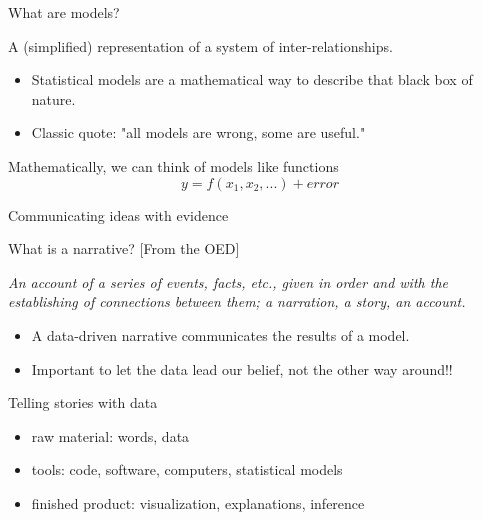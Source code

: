 \documentclass[table]{beamer}\usepackage[]{graphicx}\usepackage[]{color}
\begin{document}
\begin{frame}{What are models?}


\begin{block}{A (simplified) representation of a system of inter-relationships.}

\begin{itemize}
	\item Statistical models are a mathematical way to describe that black box of nature.
	\item Classic quote: "all models are wrong, some are useful."
\end{itemize}

\end{block}

Mathematically, we can think of models like functions
$$ y = f(x_1, x_2, ...) + error $$


\end{frame}



\begin{frame}{Communicating ideas with evidence}

\begin{block}{What is a narrative? [From the OED]}

\em An account of a series of events, facts, etc., given in order and with the establishing of connections between them; a narration, a story, an account.

\em
\begin{itemize}
  \item A data-driven narrative communicates the results of a model.
  \item Important to let the data lead our belief, not the other way around!!
\end{itemize}

\end{block}

\bigskip

\begin{block}{Telling stories with data}

\begin{itemize}
	\item raw material: words, data
	\item tools: code, software, computers, statistical models
	\item finished product: visualization, explanations, inference
\end{itemize}

\end{block}


\end{frame}
\end{document}
